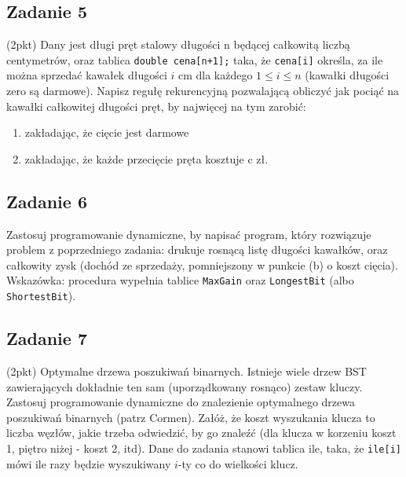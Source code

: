 \documentclass{article}
\begin{document}
\subsection*{Zadanie 5}
(2pkt) Dany jest długi pręt stalowy długości n będącej całkowitą liczbą centymetrów,
oraz tablica \verb|double cena[n+1];| taka, że \verb|cena[i]| określa, za ile można sprzedać kawałek długości $i$
cm dla każdego $1 \leq i \leq n$ (kawałki długości zero są darmowe). Napisz
regułę rekurencyjną pozwalającą obliczyć jak pociąć na kawałki całkowitej długości pręt,
by najwięcej na tym zarobić:
\begin{enumerate}[label=(\alph*)]
    \item zakładając, że cięcie jest darmowe
    \item zakładając, że każde przecięcie pręta kosztuje c zł.
\end{enumerate}

\subsection*{Zadanie 6}
Zastosuj programowanie dynamiczne, by napisać program, który rozwiązuje problem
z poprzedniego zadania: drukuje rosnącą listę długości kawałków, oraz całkowity zysk
(dochód ze sprzedaży, pomniejszony w punkcie (b) o koszt cięcia).
Wskazówka: procedura wypełnia tablice \verb|MaxGain| oraz \verb|LongestBit| (albo \verb|ShortestBit|).

\subsection*{Zadanie 7}
(2pkt) Optymalne drzewa poszukiwań binarnych. Istnieje wiele drzew BST zawierających
dokładnie ten sam (uporządkowany rosnąco) zestaw kluczy. Zastosuj programowanie
dynamiczne do znalezienie optymalnego drzewa poszukiwań binarnych (patrz Cormen).
Załóż, że koszt wyszukania klucza to liczba węzłów, jakie trzeba odwiedzić, by go
znaleźć (dla klucza w korzeniu koszt 1, piętro niżej - koszt 2, itd). Dane do zadania stanowi
tablica ile, taka, że \verb|ile[i]| mówi ile razy będzie wyszukiwany $i$-ty co do wielkości klucz.
\end{document}
